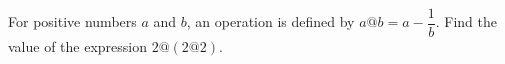 For positive numbers $a$ and $b$, an operation is defined by $a@b=a-\dfrac{1}{b}$. Find the value of the expression $2@(2@2)$.
